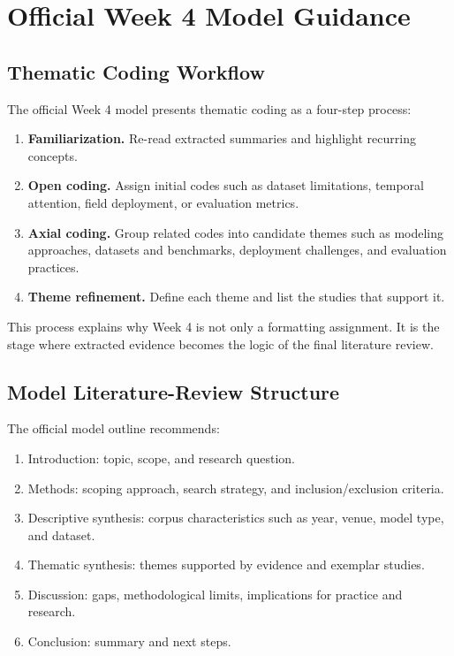 \documentclass[10pt,letterpaper]{article}
\begin{document}
\section{Official Week 4 Model Guidance}

\subsection{Thematic Coding Workflow}

The official Week 4 model presents thematic coding as a four-step process:

\begin{enumerate}
\item \textbf{Familiarization.} Re-read extracted summaries and highlight recurring concepts.
\item \textbf{Open coding.} Assign initial codes such as dataset limitations, temporal attention, field deployment, or evaluation metrics.
\item \textbf{Axial coding.} Group related codes into candidate themes such as modeling approaches, datasets and benchmarks, deployment challenges, and evaluation practices.
\item \textbf{Theme refinement.} Define each theme and list the studies that support it.
\end{enumerate}

This process explains why Week 4 is not only a formatting assignment. It is the stage where extracted evidence becomes the logic of the final literature review.

\subsection{Model Literature-Review Structure}

The official model outline recommends:

\begin{enumerate}
\item Introduction: topic, scope, and research question.
\item Methods: scoping approach, search strategy, and inclusion/exclusion criteria.
\item Descriptive synthesis: corpus characteristics such as year, venue, model type, and dataset.
\item Thematic synthesis: themes supported by evidence and exemplar studies.
\item Discussion: gaps, methodological limits, implications for practice and research.
\item Conclusion: summary and next steps.
\end{enumerate}
\end{document}

